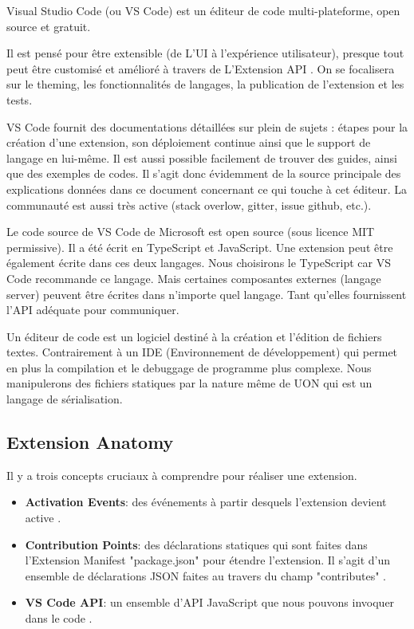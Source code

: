 \documentclass[
    iict, %
    il, %
]{heig-tb}
\begin{document}
Visual Studio Code (ou VS Code) est un éditeur de code multi-plateforme, open source et gratuit.

Il est pensé pour être extensible (de L'UI à l'expérience utilisateur), presque tout peut être customisé et amélioré à travers de L'Extension API \cite{extension-api}.
On se focalisera sur le theming, les fonctionnalités de langages, la publication de l'extension et les tests.

VS Code fournit des documentations détaillées sur plein de sujets :  étapes pour la création d'une extension, son déploiement continue ainsi que le support de langage en lui-même.
Il est aussi possible facilement de trouver des guides, ainsi que des exemples de codes.
Il s'agit donc évidemment de la source principale des explications données dans ce document concernant ce qui touche à cet éditeur.
La communauté est aussi très active (stack overlow, gitter, issue github, etc.).

Le code source de VS Code de Microsoft est open source (sous licence MIT permissive).
Il a été écrit en TypeScript et JavaScript. Une extension peut être également écrite dans ces deux langages.
Nous choisirons le TypeScript car VS Code recommande ce langage. Mais certaines composantes externes (langage server) peuvent être écrites dans n'importe quel langage. Tant qu'elles fournissent l'API adéquate pour communiquer.

Un éditeur de code est un logiciel destiné à la création et l'édition de fichiers textes.
Contrairement à un IDE (Environnement de développement) qui permet en plus la compilation et le debuggage de programme plus complexe.
Nous manipulerons des fichiers statiques par la nature même de UON qui est un langage de sérialisation.

\subsection{Extension Anatomy}
Il y a trois concepts cruciaux à comprendre pour réaliser une extension.

\begin{itemize}
    \item \textbf{Activation Events}: des événements à partir desquels l'extension devient active \cite{activation-events}.
    \item \textbf{Contribution Points}: des déclarations statiques qui sont faites dans l'Extension Manifest "package.json" pour étendre l'extension. Il s'agit d'un ensemble de déclarations JSON faites au travers du champ "contributes" \cite{contribution-points}.
    \item \textbf{VS Code API}: un ensemble d'API JavaScript que nous pouvons invoquer dans le code \cite{vs-code-api}.
\end{itemize}
\end{document}
